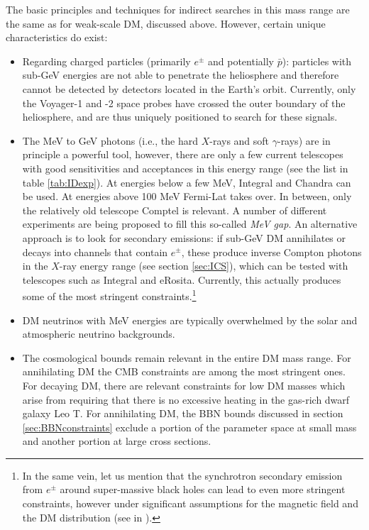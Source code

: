 \smallskip 


The basic principles and techniques for indirect searches in this mass range are the same as for weak-scale DM, discussed above. 
However, certain unique characteristics do exist:
\begin{itemize}
\item[$-$]
 Regarding charged particles (primarily $e^\pm$ and potentially $\bar p$): particles with sub-GeV energies are not able to penetrate the heliosphere and therefore cannot  be detected by detectors located in the Earth's orbit.  Currently, only the {\sc Voyager-}1 and -2 space probes have crossed the outer boundary of the heliosphere, and are thus uniquely positioned to search for these signals. 

\item[$-$]
The MeV to GeV photons (i.e., the hard $X$-rays and soft $\gamma$-rays) are in principle a powerful tool, however, there are only a few current telescopes with good sensitivities and acceptances in this energy range (see the list in table \ref{tab:IDexp}). At energies below a few MeV, {\sc Integral} and {\sc Chandra} can be used. At energies above 100 MeV {\sc Fermi-Lat} takes over. In between, only the relatively old telescope {\sc Comptel} is relevant. A number of different experiments are being proposed to fill this so-called  {\em MeV gap}. 
An alternative approach is to look for secondary emissions: if sub-GeV DM annihilates or decays into channels that contain $e^\pm$, these produce inverse Compton photons in the $X$-ray energy range (see section \ref{sec:ICS}), which can be tested with telescopes such as {\sc Integral} and {\sc eRosita}. Currently, this actually produces some of the most stringent  constraints.\footnote{In the same vein, let us mention that the synchrotron  secondary emission from $e^\pm$ around super-massive black holes can lead to even more stringent constraints, however under significant assumptions for the magnetic field and the DM distribution (see  in \cite{subGeVconstraints}).}  

\item[$-$]
DM neutrinos with MeV energies are typically overwhelmed by the solar and atmospheric neutrino backgrounds. 

\item[$-$]
The cosmological bounds remain relevant in the entire DM mass range. For annihilating DM the CMB constraints are among the most stringent ones. For decaying DM, there are relevant constraints for low DM masses which arise from requiring that there is no excessive heating in the gas-rich dwarf galaxy Leo T. For annihilating DM, the BBN bounds discussed in section \ref{sec:BBNconstraints} exclude a portion of the parameter space at small mass and another portion at large cross sections.
\end{itemize}

